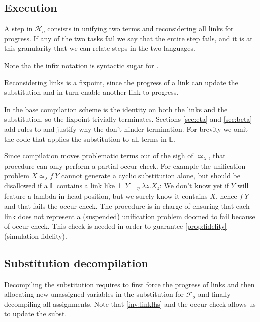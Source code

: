\documentclass[sigconf,natbib=false,review]{acmart}
\newcommand{\UnifRel}{\ensuremath{\simeq}}
\newcommand{\Ue}{\ensuremath{\UnifRel_\lambda}\xspace}
\newcommand{\Fo}{\ensuremath{\mathcal{F}_{\!o}\xspace}} %
\newcommand{\Ho}{\ensuremath{\mathcal{H}_o}\xspace}
\newcommand{\linketaM}[3]{\ensuremath{#1 \vdash #2 =_\eta #3}}
\newcommand{\linkStore}{\ensuremath{\mathbb{L}}\xspace}
\begin{document}
\subsection{Execution}
\label{sec:execution}

A step in \Ho consists in unifying two terms and reconsidering all
links for progress. If any of the two tasks fail we say that the entire step
fails, and it is at this granularity that we can relate steps in the
two languages.




\noindent
Note tha the infix notation \elpiIn{((A ~\Ue~B) C D)} is syntactic sugar for
\elpiIn{((~\Ue\!\!\!~) A B C D)}.

Reconsidering links is a fixpoint, since the progress of a link can update the
substitution and in turn enable another link to progress.



\noindent
In the base compilation scheme  is the identity
on both the links and the substitution, so the fixpoint trivially terminates.
Sections \ref{sec:eta} and \ref{sec:beta} add rules to 
and justify why the don't hinder termination. For brevity we omit the code
that applies the substitution  to all terms in \linkStore.

Since compilation moves problematic terms out of the sigh of \Ue{},
that procedure can only perform a partial occur check. For example the
unification problem $X \Ue f~Y$ cannot generate a cyclic substitution alone,
but should be disallowed if a $\linkStore$ contains a link like
$\linketaM{}{Y}{\lambda z.X_z}$: We don't know yet if $Y$ will feature
a lambda in head position, but we surely know it contains $X$, hence
$f~Y$ and that fails the occur check.
The procedure  is in charge of ensuring that
each link does not represent a (suspended) unification problem doomed
to fail because of occur check. This check is needed in order to
guarantee \cref{prop:fidelity} (simulation fidelity).

\subsection{Substitution decompilation}

Decompiling the substitution requires to first force the
progress of links and then allocating new unassigned variables
in the substitution for \Fo{} and finally decompiling all
assignments. Note that \cref{inv:linklhs} and the
occur check allows us to update the subst.
\end{document}

